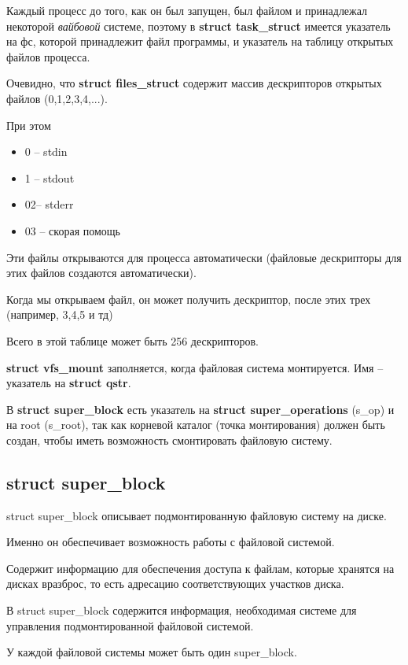 \par Каждый процесс до того, как он был запущен, был файлом и принадлежал некоторой \textit{вайбовой} системе, поэтому в \textbf{struct task\_struct} имеется указатель на фс, которой принадлежит файл программы, и указатель на таблицу открытых файлов процесса.
\par Очевидно, что \textbf{struct files\_struct} содержит массив дескрипторов открытых файлов (0,1,2,3,4,...).
\par При этом 
\begin{itemize}
\item 0 -- stdin
\item 1 -- stdout
\item 02-- stderr
\item 03 -- скорая помощь
\end{itemize}
\par Эти файлы открываются для процесса автоматически (файловые дескрипторы для этих файлов создаются автоматически).
\par Когда мы открываем файл, он может получить дескриптор, после этих трех (например, 3,4,5 и тд)
\par Всего в этой таблице может быть 256 дескрипторов.
\par \textbf{struct vfs\_mount} заполняется, когда файловая система монтируется. Имя -- указатель на \textbf{struct qstr}.
\par В \textbf{struct super\_block} есть указатель на \textbf{struct super\_operations} (s\_op) и на root (s\_root), так как корневой каталог (точка монтирования) должен быть создан, чтобы иметь возможность смонтировать файловую систему.


\subsection{struct super\_block}

struct super\_block описывает подмонтированную файловую систему на диске.

Именно он обеспечивает возможность работы с файловой системой.

Содержит информацию для обеспечения доступа к файлам, которые хранятся на дисках вразброс, то есть адресацию соответствующих участков диска.

В struct super\_block содержится информация, необходимая системе для управления подмонтированной файловой системой.

У каждой файловой системы может быть один super\_block.

